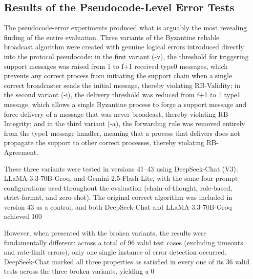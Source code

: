 \subsection{Results of the Pseudocode-Level Error Tests}

The pseudocode-error experiments produced what is arguably the most revealing finding of the entire evaluation. Three variants of the Byzantine reliable broadcast algorithm were created with genuine logical errors introduced directly into the protocol pseudocode: in the first variant (-v), the threshold for triggering support messages was raised from 1 to f+1 received type0 messages, which prevents any correct process from initiating the support chain when a single correct broadcaster sends the initial message, thereby violating RB-Validity; in the second variant (-i), the delivery threshold was reduced from f+1 to 1 type1 message, which allows a single Byzantine process to forge a support message and force delivery of a message that was never broadcast, thereby violating RB-Integrity; and in the third variant (-a), the forwarding rule was removed entirely from the type1 message handler, meaning that a process that delivers does not propagate the support to other correct processes, thereby violating RB-Agreement.

These three variants were tested in versions 41–43 using DeepSeek-Chat (V3), LLaMA-3.3-70B-Groq, and Gemini-2.5-Flash-Lite, with the same four prompt configurations used throughout the evaluation (chain-of-thought, role-based, strict-format, and zero-shot). The original correct algorithm was included in version 43 as a control, and both DeepSeek-Chat and LLaMA-3.3-70B-Groq achieved 100%

However, when presented with the broken variants, the results were fundamentally different: across a total of 96 valid test cases (excluding timeouts and rate-limit errors), only one single instance of error detection occurred. DeepSeek-Chat marked all three properties as satisfied in every one of its 36 valid tests across the three broken variants, yielding a 0%

